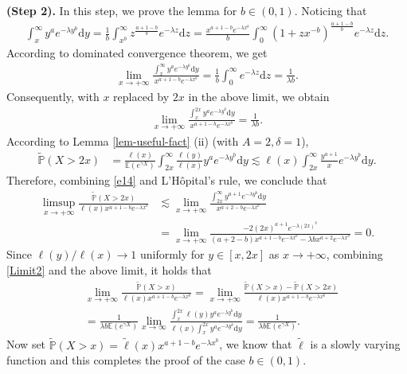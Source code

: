 \documentclass[11pt]{article}
\numberwithin{equation}{section}
\begin{document}
\noindent
{\bf (Step 2).} In this step, we prove the lemma for $b\in (0,1)$. Noticing that 
\begin{align}
	\int_x^\infty y^a e^{-\lambda y^b}\mathrm{d} y =  \frac{1}{b}\int_{x^b}^\infty z^{\frac{a+1-b}{b}} e^{-\lambda z}\mathrm{d}z = \frac{x^{a+1-b}e^{-\lambda x^b}}{b}\int_{0}^\infty (1+zx^{-b})^{\frac{a+1-b}{b}} e^{-\lambda z}\mathrm{d}z .
\end{align}
According to dominated convergence theorem,  we get
\begin{align}
	\lim_{x\to+\infty} \frac{\int_x^\infty y^a e^{-\lambda y^b}\mathrm{d} y }{x^{a+1-b}e^{-\lambda x^b}}= \frac{1}{b}\int_0^\infty e^{-\lambda z}\mathrm{d}z = \frac{1}{\lambda b}.
\end{align}
Consequently, with $x$ replaced by $2x$ in the above limit, we obtain 
\begin{align}\label{Limit2}
			\lim_{x\to+\infty} \frac{\int_x^{2x} y^a e^{-\lambda y^b}\mathrm{d} y }{x^{a+1-b}e^{-\lambda x^b}} = \frac{1}{\lambda b}.
\end{align}
According to Lemma \ref{lem-useful-fact} (ii) (with $A=2, \delta=1$), 
\begin{align}\label{e14}
		\widetilde{\mathbb{P}}(X>2x) & =\frac{\ell(x)}{\mathbb{E}(e^{\gamma X})}  \int_{2x}^\infty \frac{\ell(y)}{\ell(x)}y^a e^{-\lambda y^b}\mathrm{d}y\lesssim \ell(x)  \int_{2x}^\infty \frac{y^{a+1}}{x} e^{-\lambda y^b}\mathrm{d}y.
\end{align}
Therefore,  combining  \eqref{e14} and L'H\^opital's rule, we conclude that 
 \begin{align}
 	\limsup_{x\to+\infty} \frac{\widetilde{\mathbb{P}}(X>2x) }{\ell(x) x^{a+1-b} e^{-\lambda x^b}} & \lesssim \lim_{x\to+\infty}\frac{\int_{2x}^\infty y^{a+1} e^{-\lambda y^b}\mathrm{d}y}{x^{a+2-b} e^{-\lambda x^b}} \nonumber\\
 	& = \lim_{x\to+\infty}\frac{-2 (2x)^{a+1} e^{-\lambda (2x)^b} }{ (a+2-b)x^{a+1-b} e^{-\lambda x^b} - \lambda bx^{a+2}e^{-\lambda x^b}} =0.
 \end{align}
 Since $\ell(y)/\ell(x)\to 1$ uniformly for $y\in [x,2x]$ as $x\to+\infty$, combining \eqref{Limit2} and the above limit, it holds that 
 \begin{align}
 		 & \lim_{x\to+\infty} \frac{\widetilde{\mathbb{P}}(X>x) }{\ell(x) x^{a+1-b} e^{-\lambda x^b}}  = 	\lim_{x\to+\infty} \frac{\widetilde{\mathbb{P}}(X>x) - \widetilde{\mathbb{P}}(X>2x) }{\ell(x) x^{a+1-b} e^{-\lambda x^b}}\nonumber\\
 		&= \frac{1}{ \lambda b \mathbb{E}(e^{\gamma X})}\lim_{x\to \infty} \frac{ \int_x^{2x} \ell(y) y^a e^{-\lambda y^b}\mathrm{d}y}{\ell(x) \int_x^{2x} y^a e^{-\lambda y^b}\mathrm{d} y}  =  \frac{1}{ \lambda b \mathbb{E}(e^{\gamma X})}.
 \end{align}
 Now set $\widetilde{\mathbb P}(X>x)= \widetilde{\ell}(x) x^{a+1-b} e^{-\lambda x^b}$, we know that $\widetilde{\ell}$ is a slowly varying function and this completes the proof of the case $b\in (0,1)$.
 
\end{document}
